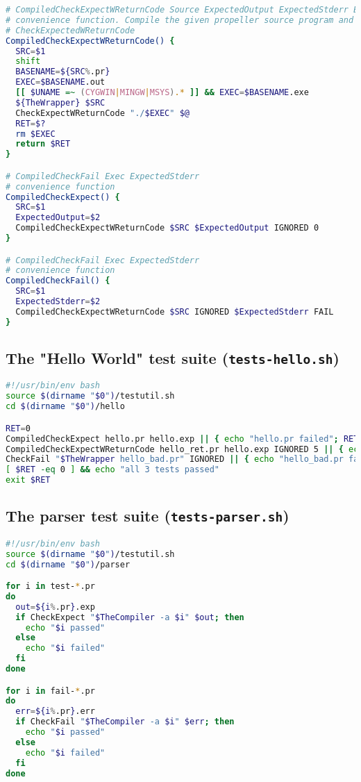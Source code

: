\begin{lstlisting}[language=bash,backgroundcolor=\color{backgroundcolor}]
# CompiledCheckExpectWReturnCode Source ExpectedOutput ExpectedStderr ExpectedReturnCode
# convenience function. Compile the given propeller source program and run it with
# CheckExpectedWReturnCode
CompiledCheckExpectWReturnCode() {
  SRC=$1
  shift
  BASENAME=${SRC%.pr}
  EXEC=$BASENAME.out
  [[ $UNAME =~ (CYGWIN|MINGW|MSYS).* ]] && EXEC=$BASENAME.exe
  ${TheWrapper} $SRC
  CheckExpectWReturnCode "./$EXEC" $@
  RET=$?
  rm $EXEC
  return $RET
}

# CompiledCheckFail Exec ExpectedStderr
# convenience function
CompiledCheckExpect() {
  SRC=$1
  ExpectedOutput=$2
  CompiledCheckExpectWReturnCode $SRC $ExpectedOutput IGNORED 0
}

# CompiledCheckFail Exec ExpectedStderr
# convenience function
CompiledCheckFail() {
  SRC=$1
  ExpectedStderr=$2
  CompiledCheckExpectWReturnCode $SRC IGNORED $ExpectedStderr FAIL
}
\end{lstlisting}

\subsection{The "Hello World" test suite (\texttt{tests-hello.sh})}

\begin{lstlisting}[language=bash,backgroundcolor=\color{backgroundcolor}]
#!/usr/bin/env bash
source $(dirname "$0")/testutil.sh
cd $(dirname "$0")/hello

RET=0
CompiledCheckExpect hello.pr hello.exp || { echo "hello.pr failed"; RET=1; }
CompiledCheckExpectWReturnCode hello_ret.pr hello.exp IGNORED 5 || { echo "hello_ret.pr failed"; RET=1; }
CheckFail "$TheWrapper hello_bad.pr" IGNORED || { echo "hello_bad.pr failed"; RET=1; }
[ $RET -eq 0 ] && echo "all 3 tests passed"
exit $RET
\end{lstlisting}

\subsection{The parser test suite (\texttt{tests-parser.sh})}

\begin{lstlisting}[language=bash,backgroundcolor=\color{backgroundcolor}]
#!/usr/bin/env bash
source $(dirname "$0")/testutil.sh
cd $(dirname "$0")/parser

for i in test-*.pr
do
  out=${i%.pr}.exp
  if CheckExpect "$TheCompiler -a $i" $out; then
    echo "$i passed"
  else
    echo "$i failed"
  fi
done

for i in fail-*.pr
do
  err=${i%.pr}.err
  if CheckFail "$TheCompiler -a $i" $err; then
    echo "$i passed"
  else
    echo "$i failed"
  fi
done
\end{lstlisting}

